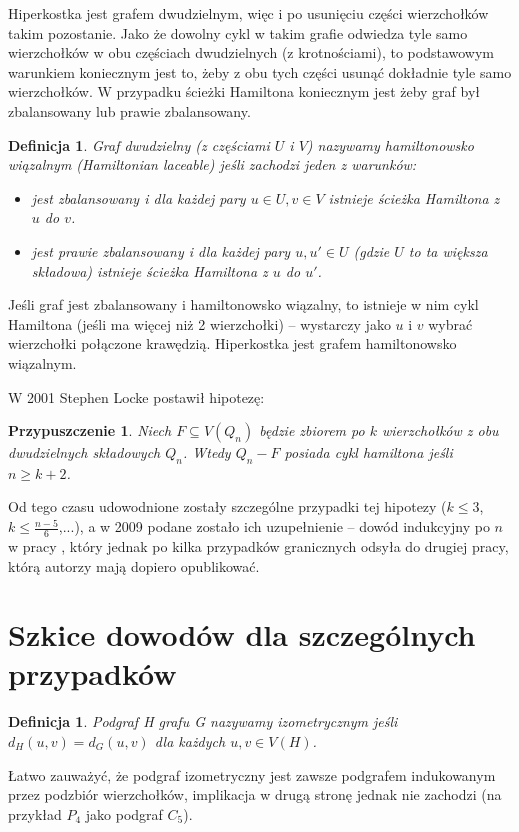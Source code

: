 \documentclass{pracamgr}
\newtheorem{defi}[theorem]{Definicja} %
\newtheorem{conjecture}[theorem]{Przypuszczenie}
\begin{document}
   Hiperkostka jest grafem dwudzielnym, więc i po usunięciu części wierzchołków takim pozostanie.
   Jako że dowolny cykl w takim grafie odwiedza tyle samo wierzchołków w obu częściach dwudzielnych (z krotnościami),
   to podstawowym warunkiem koniecznym jest to, żeby z obu tych części usunąć dokładnie tyle samo wierzchołków.
   W przypadku ścieżki Hamiltona koniecznym jest żeby graf był zbalansowany lub prawie zbalansowany.
   
   \begin{defi}\label{Hamiltonian lacable}
    Graf dwudzielny (z częściami $U$ i $V$) nazywamy hamiltonowsko wiązalnym (Hamiltonian laceable) jeśli zachodzi jeden z warunków:
    \begin{itemize}
     \item jest zbalansowany i dla każdej pary $u\in U,v\in V$ istnieje ścieżka Hamiltona z $u$ do $v$.
     \item jest prawie zbalansowany i dla każdej pary $u,u'\in U$ (gdzie $U$ to ta większa składowa) istnieje ścieżka Hamiltona
      z $u$ do $u'$.
    \end{itemize}
   \end{defi}
   \noindent
   Jeśli graf jest zbalansowany i hamiltonowsko wiązalny, to istnieje w nim cykl Hamiltona (jeśli ma więcej niż 2 wierzchołki) -- wystarczy jako $u$ i $v$ wybrać
   wierzchołki połączone krawędzią.\newline
   Hiperkostka jest grafem hamiltonowsko wiązalnym.\newline

   W 2001 Stephen Locke postawił hipotezę:
   \begin{conjecture}\label{Locke conjecture}
    Niech $F\subseteq V(Q_n)$ będzie zbiorem po $k$ wierzchołków z obu dwudzielnych składowych $Q_n$. Wtedy $Q_n-F$ posiada cykl hamiltona jeśli
    $n\ge k+2$.
   \end{conjecture}
   Od tego czasu udowodnione zostały szczególne przypadki tej hipotezy ($k\le3$, $k\le\frac{n-5}{6}$,...),
   a w 2009 podane zostało ich uzupełnienie -- dowód indukcyjny po $n$ w pracy \cite{Locke}, który jednak po kilka przypadków granicznych odsyła
   do drugiej pracy, którą autorzy mają dopiero opublikować.
   
  \section{Szkice dowodów dla szczególnych przypadków}
   \begin{defi}\label{podgraf izometryczny}
    Podgraf H grafu G nazywamy \emph{izometrycznym} jeśli $d_H(u,v)=d_G(u,v)$ dla każdych $u,v\in V(H)$.
   \end{defi}
   Łatwo zauważyć, że podgraf izometryczny jest zawsze podgrafem indukowanym przez podzbiór wierzchołków,
   implikacja w drugą stronę jednak nie zachodzi (na przykład $P_4$ jako podgraf $C_5$).
\end{document}
